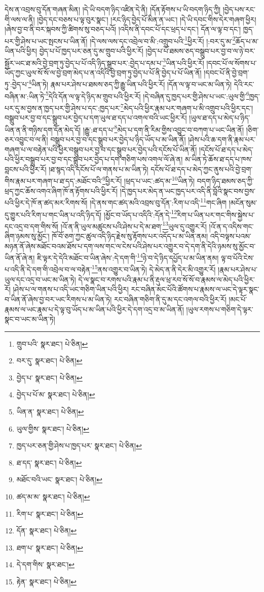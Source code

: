 དེས་ན་འབྲས་བུ་དོན་གཞན་མིན། །དེ་ཡི་བདག་ཉིད་འཛིན་དེ་ནི། །དོན་རྟོགས་པ་ཡི་བདག་ཉིད་ཀྱི། །བྱེད་པས་རང་གི་ལས་ལ་ནི། །བྱེད་དང་བཅས་པ་ལྟ་བུར་སྣང་། །རང་ཉིད་བྱེད་པོ་མིན་ན་ཡང་། །དེ་ཡི་དབང་གིས་དེར་གཞག་ཕྱིར། །ཞེས་བྱ་བ་ནི་བར་སྐབས་ཀྱི་ཚིགས་སུ་བཅད་པའོ། །འདིས་ནི་དབང་པོ་དང་ཕྲད་པ་དང་། དོན་ལ་ལྟ་བ་དང་། ཁྱད་པར་གྱི་ཤེས་པ་ཡང་སྤངས་པ་ཡིན་ནོ། །དེ་ལས་ལས་དང་འབྲེལ་བ་མི་:འགྲུབ་པའི་\footnote{གྲུབ་པའི་  སྣར་ཐང་།  པེ་ཅིན། }ཕྱིར་རོ། །:བར་དུ་མ་\footnote{བར་དུ་  སྣར་ཐང་།  པེ་ཅིན། }ཆོད་པ་མ་ཡིན་པའི་ཕྱིར། བྱེད་པ་པོ་ཁྱད་པར་ཅན་དུ་མ་གྲུབ་པའི་ཕྱིར་རོ། །བྱེད་པ་པོ་ཐམས་ཅད་བསྒྲུབ་པར་བྱ་བ་ལ་ཉེ་བར་སྦྱོར་ཡང་ཐ་མའི་བྱེ་བྲག་ཏུ་བྱེད་པ་པོ་འདི་ཉིད་སྒྲུབ་པར་:བྱེད་པ་དམ་པ་\footnote{བྱེད་པ་  སྣར་ཐང་།  པེ་ཅིན། }ཡིན་པའི་ཕྱིར་རོ། །དབང་པོ་ལ་སོགས་པ་ཡོད་ཀྱང་ཡུལ་སོ་སོ་ལ་བྱེ་བྲག་མེད་པ་ན་འདིའི་བྱེ་བྲག་ཏུ་བྱེད་པ་པོ་ནི་བྱེད་པ་པོ་ཡིན་ནོ། །དབང་པོ་ནི་བྱེ་བྲག་ཏུ་:བྱེད་པ་\footnote{བྱེད་པ་པོ་མ་  སྣར་ཐང་།  པེ་ཅིན། }ཡིན་ཏེ། རྣམ་པར་ཤེས་པ་ཐམས་ཅད་ཀྱི་རྒྱུ་ཡིན་པའི་ཕྱིར་རོ། །དོན་ལ་ལྟ་བ་ཡང་མ་ཡིན་ཏེ། དེའི་རང་བཞིན་མ་:ཡིན་ཏེ་\footnote{ཡིན་ན་  སྣར་ཐང་།  པེ་ཅིན། }དེའི་དོན་ལ་ལྟ་དེ་ཉིད་མ་གྲུབ་པའི་ཕྱིར་རོ། །དེ་བཞིན་དུ་ཁྱད་པར་གྱི་ཤེས་པ་ཡང་:ཡུལ་གྱི་\footnote{ཡུལ་གྱིས་  སྣར་ཐང་།  པེ་ཅིན། }ཁྱད་པར་དུ་མ་བྱས་ན་ཁྱད་པར་གྱི་ཤེས་པ་དང་:ཁྱད་པར་\footnote{ཁྱད་པར་ཅན་གྱི་ཤེས་པ་ཁྱད་པར་  སྣར་ཐང་།  པེ་ཅིན། }མེད་པའི་ཕྱིར་རྣམ་པར་གཞག་པ་མི་འགྲུབ་པའི་ཕྱིར་དང་། བསྒྲུབ་པར་བྱ་བ་དང་སྒྲུབ་པར་བྱེད་པ་དག་ཡུལ་ཐ་དད་པ་འགལ་བའི་ཡང་ཕྱིར་རོ། །ཡུལ་ཐ་དད་པ་མེད་པ་ཉིད་ཡིན་ན་ནི་གཉིས་དག་དོན་མེད་དོ། །རྒྱུ་:ཐ་དད་པ་\footnote{ཐ་དད་  སྣར་ཐང་།  པེ་ཅིན། }མེད་པ་དག་ནི་རིམ་གྱིས་འབྱུང་བ་བཀག་པ་ཡང་ཡིན་ནོ། །ཅིག་ཅར་འབྱུང་བ་ལ་ནི། བསྒྲུབ་པར་བྱ་བ་དང་སྒྲུབ་པར་བྱེད་པ་ཉིད་ཡོད་པ་མ་ཡིན་ནོ། །ཤེས་པའི་ཆ་དག་ནི་རྣམ་པར་གཞག་པ་ལ་བརྟེན་པའི་ཕྱིར་བསྒྲུབ་པར་བྱ་བ་དང་སྒྲུབ་པར་བྱེད་པའི་དངོས་པོ་ཡིན་ནོ། །དངོས་པོ་ཐ་དད་པ་མེད་པའི་ཕྱིར་བསྒྲུབ་པར་བྱ་བ་དང་སྒྲུབ་པར་བྱེད་པ་དག་གཅིག་པས་འགལ་ལོ་ཞེ་ན། མ་ཡིན་ཏེ་ཆོས་ཐ་དད་པ་ཁས་བླངས་པའི་ཕྱིར་རོ། །ཐ་སྙད་འདི་དངོས་པོ་ལ་གནས་པ་མ་ཡིན་ཏེ། དངོས་པོ་ཐ་དད་པ་མེད་ཀྱང་ནུས་པའི་བྱེ་བྲག་གིས་རྣམ་པར་གཞག་པ་ཐ་དད་:མཐོང་བའི་\footnote{མཐོང་བའི་ཡང་  སྣར་ཐང་།  པེ་ཅིན། }ཕྱིར་རོ། །ཕྲད་པ་ཡང་:ཚད་མ་\footnote{ཚད་མ་མ་  སྣར་ཐང་།  པེ་ཅིན། }ཡིན་ཏེ། བདག་ཉིད་ཐམས་ཅད་ཀྱི་ཕྲད་ཀྱང་ཆོས་འགའ་ཞིག་ཁོ་ན་རྟོགས་པའི་ཕྱིར་རོ། །དེ་ཁྱད་པར་མེད་ན་ཡང་ཁྱད་པར་འདི་ནི་བློའི་སྣང་བས་བྱས་པའི་ཕྱིར་དེ་ཁོ་ན་ཚད་མར་རིགས་སོ། །དེ་ནས་གང་ཚད་མའི་འབྲས་བུ་དོན་:རིག་པ་འདི་\footnote{རིག་པ་  སྣར་ཐང་།  པེ་ཅིན། }གང་ཞིག །མངོན་སུམ་དུ་གྱུར་པའི་རིག་པ་གང་ཡིན་པ་འདི་ཉིད་དོ། །མྱོང་བ་ཡོད་པ་འདིའི་:དོན་དེ་\footnote{དོན་  སྣར་ཐང་།  པེ་ཅིན། }རིག་པ་ཡིན་པར་གང་གིས་སྐྱེས་པ་དང་འདྲ་བ་དག་གིས་སོ། །འོ་ན་ནི་ཡུལ་མཚུངས་པའི་ཤེས་པ་དེ་མ་ཐག་\footnote{ཐག་པ་  སྣར་ཐང་།  པེ་ཅིན། }ཡུལ་དུ་འགྱུར་རོ། །འོ་ན་ད་འདིས་གང་ཞིག་ཉམས་སུ་མྱོང་། ཁོ་བོ་ཅག་ཀྱང་ཚུལ་འདི་ཉིད་རྗེས་སུ་རྟོགས་པར་འདོད་པ་མ་ཡིན་ནམ། འདི་བལྟས་པའམ་མཉན་ནོ་ཞེས་མཐོང་བའམ་ཐོས་པ་དག་ལས་གང་ལ་ངེས་པའི་ཤེས་པར་འགྱུར་བ་དེ་དག་ནི་དེའི་ཉམས་སུ་མྱོང་བ་ཡིན་ནོ་ཞེ་ན། ཇི་ལྟར་དེ་དེའི་མཐོང་བ་ཡིན་ཞེས་:དེ་དག་གི་\footnote{དེ་དག་གིས་  སྣར་ཐང་། }ཉེ་བ་དེ་ཉིད་དཔྱོད་པ་མ་ཡིན་ནམ། ལྟ་བ་པོའི་ངེས་པ་འདི་ནི་དེ་དག་གི་འབྲེལ་བ་ལ་བརྟེན་\footnote{རྟེན་  སྣར་ཐང་།  པེ་ཅིན། }ནས་འགྱུར་བ་ཡིན་ཏེ། དེ་མེད་ན་ནི་དེར་མི་འགྱུར་རོ། །རྣམ་པར་ཤེས་པ་ཡུལ་དང་འདྲ་བ་ཡང་མ་ཡིན་ཏེ། དེ་ལ་སྣང་བ་རགས་པའི་རྣམ་པ་ནི་རྡུལ་ཕྲ་རབ་སོ་སོ་བ་རྣམས་ལ་མེད་པའི་ཕྱིར་རོ། །ཤེས་པ་ལ་གནས་པ་འདི་ཡང་གཅིག་ཡིན་པའི་ཕྱིར། རང་བཞིན་མང་པོའི་ཚོགས་པ་རྣམས་ལ་ཡང་དེ་ལྟར་སྣང་བ་ཡིན་ནོ་ཞེས་བྱ་བར་ཡང་རིགས་པ་མ་ཡིན་ཏེ། རང་བཞིན་གཅིག་ནི་དུ་མ་དང་འགལ་བའི་ཕྱིར་རོ། །མང་པོ་རྣམས་ལ་ཡང་རྣམ་པ་དེ་ལྟ་བུ་ཡོད་པ་མ་ཡིན་པའི་ཕྱིར་དེ་དག་འདྲ་བ་མ་ཡིན་ནོ། །ཡུལ་རགས་པ་གཅིག་དེ་ལྟར་སྣང་བ་ཡང་མ་ཡིན་ཏེ། 